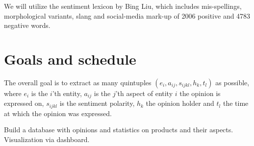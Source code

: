 \documentclass[10pt,a4paper]{article}
\begin{document}
	We will utilize the sentiment lexicon by Bing Liu, which includes mis-spellings, morphological variants, slang and social-media mark-up of 2006 positive and 4783 negative words.

	\section{Goals and schedule}
	The overall goal is to extract as many quintuples $(e_i, a_{ij}, s_{ijkl}, h_k, t_l)$ as possible, where $e_i$ is the $i$'th entity, $a_{ij}$ is the $j$'th aspect of entity $i$ the opinion is expressed on, $s_{ijkl}$ is the sentiment polarity, $h_k$ the opinion holder and $t_l$ the time at which the opinion was expressed.
	
	Build a database with opinions and statistics on products and their aspects.
	Visualization via dashboard.

	\newpage

	\nocite{DBLP:journals/corr/AndorAWSPGPC16}
	\nocite{Liu12sentimentanalysis}
	\nocite{Zhang2014}
	\nocite{pennington2014glove}
	\nocite{syntaxnet}

	
	
\end{document}
